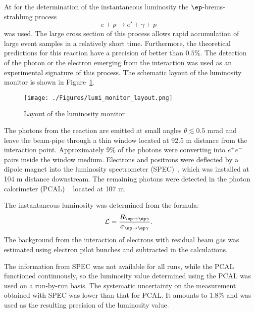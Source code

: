 At \zeus for the determination of the instantaneous luminosity the $\ep$-brems-strahlung process~\cite{Bethe:1934za}
\begin{equation}
	e + p \rightarrow e' + \gamma + p
\end{equation}
was used. The large cross section of this process allows rapid accumulation of large event samples in a relatively short time. Furthermore, the theoretical predictions for this reaction have a precision of better than $0.5\%$. The detection of the photon or the electron emerging from the interaction was used as an experimental signature of this process. The schematic layout of the luminosity monitor is shown in Figure~\ref{fig:lumi_monitor_layout}.
\begin{figure}
	\centering
		\texttt{[image: ./Figures/lumi\_monitor\_layout.png]}
	\caption{Layout of the \zeus luminosity monitor}
	\label{fig:lumi_monitor_layout}
\end{figure}
The photons from the reaction are emitted at small angles $\theta \lesssim 0.5$ mrad and leave the beam-pipe through a thin window located at $92.5$ m distance from the interaction point. Approximately $9\%$ of the photons were converting into $e^+e^-$ pairs inside the window medium. Electrons and positrons were deflected by a dipole magnet into the luminosity spectrometer (SPEC)~\cite{physics-0512153}, which was installed at 104 m distance downstream. The remaining photons were detected in the photon calorimeter (PCAL) ~\cite{desy-92-066,zfp:c63:391,acpp:b32:2025} located at 107 m.

The instantaneous luminosity was determined from the formula:
\begin{equation}
\mathcal{L} = \frac{R_{\ep\rightarrow \ep\gamma}}{ \sigma_{\ep\rightarrow \ep\gamma}}.
\end{equation}
The background from the interaction of electrons with residual beam gas was estimated using electron pilot bunches and subtracted in the calculations.

The information from SPEC was not available for all runs, while the PCAL functioned continuously, so the luminosity value determined using the PCAL was used on a run-by-run basis. The systematic uncertainty on the measurement obtained with SPEC was lower than that for PCAL. It amounts to $1.8\%$ and was used as the resulting precision of the luminosity value.

